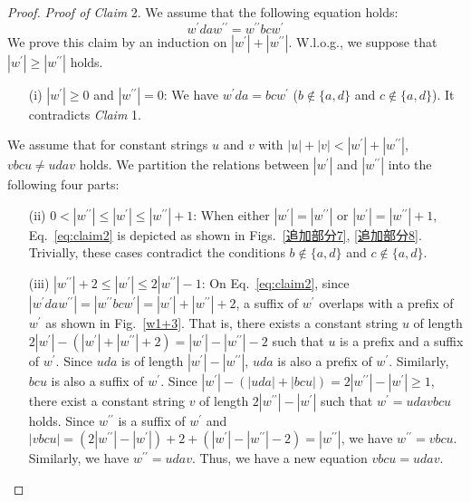 \begin{proof}
  \noindent
  \textit{Proof of Claim} 2.
  We assume that the following equation holds:
  \begin{equation}
  w^{\prime}daw^{\prime\prime} = w^{\prime\prime}bcw^{\prime}\label{eq:claim2}
  \end{equation}
  We prove this claim by an induction on $|w^{\prime}| + |w^{\prime\prime}|$.
  W.l.o.g., we suppose that $|w^{\prime}| \geq |w^{\prime\prime}|$ holds.
  \begin{enumerate}
    \item[(i)] $|w^{\prime}| \geq 0$ and $|w^{\prime\prime}|=0$:
    We have $w^{\prime}da = bcw^{\prime}$ ($b \not\in \{a,d\}$ and $c \not\in \{a,d\}$).
    It contradicts \textit{Claim} 1.
  \end{enumerate}
  We assume that for constant strings $u$ and $v$ with $|u| + |v| < |w^{\prime}| + |w^{\prime\prime}|$, $vbcu \not= udav$ holds.
  We partition the relations between $|w^{\prime}|$ and $|w^{\prime\prime}|$ into the following four parts:
  \begin{enumerate}
  \item[(ii)] $0 < |w^{\prime\prime}| \le |w^{\prime}| \le |w^{\prime\prime}|+1$:
  When either $|w^{\prime}|=|w^{\prime\prime}|$ or $|w^{\prime}|=|w^{\prime\prime}|+1$, Eq.~\ref{eq:claim2} is depicted as shown in Figs.~\ref{追加部分7}, \ref{追加部分8}. Trivially, these cases contradict the conditions $b \not\in \{a,d\}$ and $c \not\in \{a,d\}$.
  \item[(iii)] $|w^{\prime\prime}|+2 \le |w^{\prime}| \le 2|w^{\prime\prime}| - 1$:
  On Eq.~\ref{eq:claim2}, since $|w^{\prime}daw^{\prime\prime}| = |w^{\prime\prime}bcw^{\prime}| = |w^{\prime}| + |w^{\prime\prime}| + 2$, a suffix of $w^{\prime}$ overlaps with a prefix of $w^{\prime}$ as shown in Fig.~\ref{w1+3}. That is, there exists a constant string $u$ of length $2|w^{\prime}| - (|w^{\prime}| + |w^{\prime\prime}| + 2) = |w^{\prime}| - |w^{\prime\prime}| - 2$ such that $u$ is a prefix and a suffix of $w^{\prime}$.
  Since $uda$ is of length $|w^{\prime}| - |w^{\prime\prime}|$, $uda$ is also a prefix of $w^{\prime}$. Similarly, $bcu$ is also a suffix of $w^{\prime}$.
  Since $|w^{\prime}| - (|uda| + |bcu|) = 2|w^{\prime\prime}| - |w^{\prime}| \ge 1$, there exist a constant string $v$ of length $2|w^{\prime\prime}| - |w^{\prime}|$ such that $w^{\prime} = udavbcu$ holds. Since $w^{\prime\prime}$ is a suffix of $w^{\prime}$ and $|vbcu| = (2|w^{\prime\prime}| - |w^{\prime}|) + 2 + (|w^{\prime}| - |w^{\prime\prime}| - 2) = |w^{\prime\prime}|$, we have $w^{\prime\prime} = vbcu$. Similarly, we have $w^{\prime\prime} = udav$. Thus, we have a new equation $vbcu = udav$.

\end{enumerate}
\end{proof}
